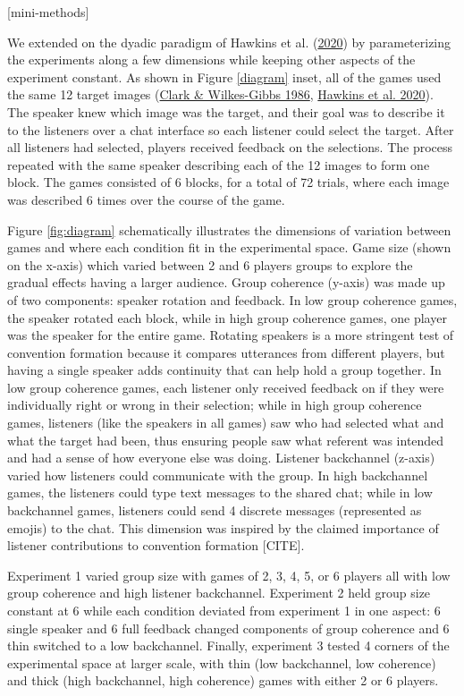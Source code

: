 \documentclass[
  english,
  a4paper,
]{article}
\begin{document}
{[}mini-methods{]}

We extended on the dyadic paradigm of Hawkins et al. (\protect\hyperlink{ref-hawkinsCharacterizingDynamicsLearning2020}{2020}) by parameterizing the experiments along a few dimensions while keeping other aspects of the experiment constant. As shown in Figure \ref{diagram} inset, all of the games used the same 12 target images (\protect\hyperlink{ref-clarkReferringCollaborativeProcess1986}{Clark \& Wilkes-Gibbs 1986}, \protect\hyperlink{ref-hawkinsCharacterizingDynamicsLearning2020}{Hawkins et al. 2020}). The speaker knew which image was the target, and their goal was to describe it to the listeners over a chat interface so each listener could select the target. After all listeners had selected, players received feedback on the selections. The process repeated with the same speaker describing each of the 12 images to form one block. The games consisted of 6 blocks, for a total of 72 trials, where each image was described 6 times over the course of the game.

Figure \ref{fig:diagram} schematically illustrates the dimensions of variation between games and where each condition fit in the experimental space. Game size (shown on the x-axis) which varied between 2 and 6 players groups to explore the gradual effects having a larger audience. Group coherence (y-axis) was made up of two components: speaker rotation and feedback. In low group coherence games, the speaker rotated each block, while in high group coherence games, one player was the speaker for the entire game. Rotating speakers is a more stringent test of convention formation because it compares utterances from different players, but having a single speaker adds continuity that can help hold a group together. In low group coherence games, each listener only received feedback on if they were individually right or wrong in their selection; while in high group coherence games, listeners (like the speakers in all games) saw who had selected what and what the target had been, thus ensuring people saw what referent was intended and had a sense of how everyone else was doing. Listener backchannel (z-axis) varied how listeners could communicate with the group. In high backchannel games, the listeners could type text messages to the shared chat; while in low backchannel games, listeners could send 4 discrete messages (represented as emojis) to the chat. This dimension was inspired by the claimed importance of listener contributions to convention formation {[}CITE{]}.

Experiment 1 varied group size with games of 2, 3, 4, 5, or 6 players all with low group coherence and high listener backchannel. Experiment 2 held group size constant at 6 while each condition deviated from experiment 1 in one aspect: 6 single speaker and 6 full feedback changed components of group coherence and 6 thin switched to a low backchannel. Finally, experiment 3 tested 4 corners of the experimental space at larger scale, with thin (low backchannel, low coherence) and thick (high backchannel, high coherence) games with either 2 or 6 players.
\end{document}
